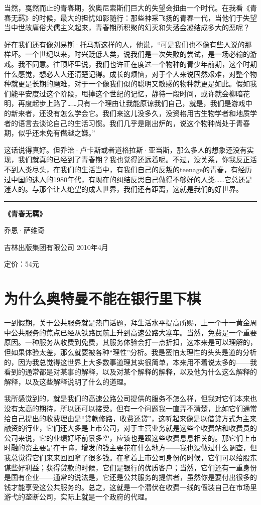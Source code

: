 当然，戛然而止的青春期，狄奥尼索斯们巨大的失望会扭曲一个时代。在我看《青春无羁》的时候，最大的担忧如影随行：那些神采飞扬的青春一代，当他们于失望当中世故庸俗犬儒主义起来，青春期所积聚的幻灭和失落会凝结成多大的恶呢？

好在我们还有像刘易斯·托马斯这样的人，他说，``可是我们也不像有些人说的那样坏。一个世纪以来，时兴贬低人类，说我们是一次失败的尝试，是一场必输的游戏。我不同意。往顶坏里说，我们也许正在度过一个物种的青少年前期，这个时期什么感觉，想必人人还清楚记得。成长的烦恼，对于个人来说固然艰难，对整个物种就更是长期的磨难，对于一个像我们似的聪明又敏感的物种就更是如此。假如我们能平安度过这个阶段，甩掉这个世纪的记忆，静待一段时间，或许就会柳暗花明，再度起步上路了\ldots{}\ldots{}只有一个理由让我能原谅我们自己，就是，我们是游戏中的新来者，还没有怎么学会它。我们来这儿没多久，没资格用古生物学者和地质学者的语言去谈论自己的生活习惯。我们几乎是刚出炉的，说这个物种尚处于青春期，似乎还未免有僭越之嫌。''

这话说得真好。但乔治·卢卡斯或者道格拉斯·亚当斯，那么多人的想象还没有实现，我们就真的已经到了青春期？我也觉得还远着呢。不过，没关系，你我反正活不到人类尽头，在我们的生活当中，有我们自己的反叛的teenage的青春，有经历过中国的迷人的1980年代，有现在的纠结反思自己做得不够好的人类\ldots{}\ldots{}它总还是迷人的。与那个让人绝望的成人世界，我们还有距离，这就是我们的好世界。

\begin{center}\rule{3in}{0.4pt}\end{center}

\textbf{《青春无羁》}

乔恩·萨维奇

吉林出版集团有限公司 2010年4月

定价：54元

\section{为什么奥特曼不能在银行里下棋}

一到假期，关于公共服务就是热门话题，拜生活水平提高所赐，上一个十一黄金周中公共服务的焦点已经从铁路民航上升到高速公路大塞车。当然，免费是一个重要原因。一种服务从收费到免费，其服务体验会打一点折扣，这本来是可以理解的，但如果体验太差，那么就要被各种``理性''分析。我是蛮怕太理性的头头是道的分析的，因为我总觉得这世界上大多数事道理其实很简单，本来用不着说太多的------我看到的通常都是对某事的解释，以及对某个解释的解释，以及他为什么这么解释的解释，以及这些解释说明了什么的道理。

我所感觉到的，就是我们的高速公路公司提供的服务不怎么样，但我对它们本来也没有太高的期待，所以还可以接受。但有一个问题我一直弄不清楚，比如它们通常给自己提出的收费理由是``贷款修路，收费还贷''，这听起来像是以借贷方式为主来融资的行业，它们还大多是上市公司，对于主营业务就是这些个收费站和收费员的公司来说，它的业绩好坏前景多空，应该也是跟这些收费息息相关的。那它们上市时融的资主要是在干嘛，增发的钱主要花在什么地方------我也没做过什么调查，但我总觉得它们来来回回拿了很多钱。在拿着上市公司身份的时候，它们可以给股东谋些好利益；获得贷款的时候，它们是银行的优质客户；当然，它们还有一重身份是国有企业------通常的说法是，它还是公共服务的提供者，虽然你是要付出很多的钱才能享受这公共服务的。总之，这就是一个潜伏在收费一线的假装自己在市场里游弋的垄断公司，实际上就是一个政府的代理。

